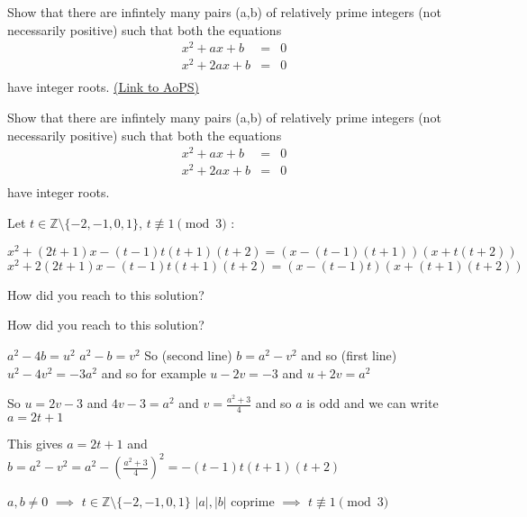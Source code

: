 \begin{problem}
	Show that there are infintely many pairs (a,b) of relatively prime integers (not necessarily positive) such that both the equations \begin{eqnarray*} x^2 +ax +b &=& 0 \\ x^2 + 2ax + b &=& 0 \\ \end{eqnarray*} have integer roots.
	\flushright \href{https://artofproblemsolving.com/community/c6h615950}{(Link to AoPS)}
\end{problem}



\begin{solution}
	\begin{tcolorbox}Show that there are infintely many pairs (a,b) of relatively prime integers (not necessarily positive) such that both the equations \begin{eqnarray*} x^2 +ax +b &=& 0 \\ x^2 + 2ax + b &=& 0 \\ \end{eqnarray*} have integer roots.\end{tcolorbox}
Let $t\in\mathbb Z\setminus\{-2,-1,0,1\}$, $t\not\equiv 1\pmod 3$ :

$x^2+(2t+1)x-(t-1)t(t+1)(t+2)=(x-(t-1)(t+1))(x+t(t+2))$
$x^2+2(2t+1)x-(t-1)t(t+1)(t+2)=(x-(t-1)t)(x+(t+1)(t+2))$
\end{solution}



\begin{solution}
	How did you reach to this solution?
\end{solution}



\begin{solution}
	\begin{tcolorbox}How did you reach to this solution?\end{tcolorbox}
$a^2-4b=u^2$
$a^2-b=v^2$
So (second line) $b=a^2-v^2$ and so (first line) $u^2-4v^2=-3a^2$ and so for example $u-2v=-3$ and $u+2v=a^2$

So $u=2v-3$ and $4v-3=a^2$ and $v=\frac{a^2+3}4$ and so $a$ is odd and we can write $a=2t+1$

This gives $a=2t+1$ and $b=a^2-v^2=a^2-\left(\frac{a^2+3}4\right)^2=-(t-1)t(t+1)(t+2)$

$a,b\ne 0$ $\implies$ $t\in\mathbb Z\setminus\{-2,-1,0,1\}$
$|a|,|b|$ coprime $\implies$ $t\not\equiv 1\pmod 3$
\end{solution}



